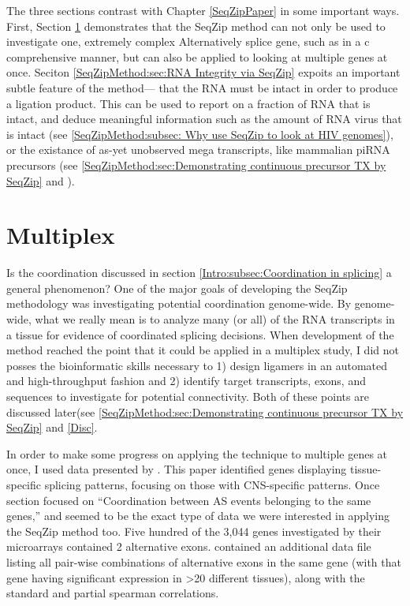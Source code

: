   The three sections contrast with Chapter \ref{SeqZipPaper} in some important ways. First, Section \ref{SeqZipMethod:sec:Multiplex Gene Study} demonstrates that the SeqZip method can not only be used to investigate one, extremely complex Alternatively splice gene, such as \dscam{} in a c comprehensive manner, but can also be applied to looking at multiple genes at once. Seciton \ref{SeqZipMethod:sec:RNA Integrity via SeqZip} expoits an important subtle feature of the method--- that the RNA must be intact in order to produce a ligation product. This can be used to report on a fraction of RNA that is intact, and deduce meaningful information such as the amount of RNA virus that is intact (see \ref{SeqZipMethod:subsec: Why use SeqZip to look at HIV genomes}), or the existance of as-yet unobserved mega transcripts, like mammalian piRNA precursors (see \ref{SeqZipMethod:sec:Demonstrating continuous precursor TX by SeqZip} and \citep{Li2013h,Li2013}).

\section{Multiplex}
  \label{SeqZipMethod:sec:Multiplex Gene Study}

  Is the coordination discussed in section \ref{Intro:subsec:Coordination in splicing} a general phenomenon? One of the major goals of developing the SeqZip methodology was investigating potential coordination genome-wide. By genome-wide, what we really mean is to analyze many (or all) of the RNA transcripts in a tissue for evidence of coordinated splicing decisions. When development of the method reached the point that it could be applied in a multiplex study, I did not posses the bioinformatic skills necessary to 1) design ligamers in an automated and high-throughput fashion and 2) identify target transcripts, exons, and sequences to investigate for potential connectivity. Both of these points are discussed later(see \ref{SeqZipMethod:sec:Demonstrating continuous precursor TX by SeqZip} and \ref{Disc}. 

  In order to make some progress on applying the technique to multiple genes at once, I used data presented by \citet{Fagnani2007}. This paper identified genes displaying tissue-specific splicing patterns, focusing on those with CNS-specific patterns. Once section focused on ``Coordination between AS events belonging to the same genes,'' and seemed to be the exact type of data we were interested in applying the SeqZip method too. Five hundred of the 3,044 genes investigated by their microarrays contained 2 alternative exons. \citet{Fagnani2007} contained an additional data file listing all pair-wise combinations of alternative exons in the same gene (with that gene having significant expression in >20 different tissues), along with the standard and partial spearman correlations. 

